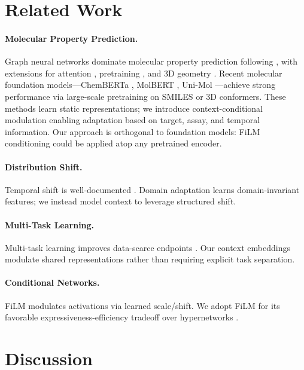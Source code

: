 \documentclass{article}
\begin{document}
\section{Related Work}
\label{sec:related}

\paragraph{Molecular Property Prediction.}
Graph neural networks dominate molecular property prediction following \citet{gilmer_2017_mpnn}, with extensions for attention \citep{xiong_2020_attentivefp}, pretraining \citep{rong_2020_grover, hu_2020_gnn_pretrain}, and 3D geometry \citep{schutt_2017_schnet, gasteiger_2020_dimenet}. Recent molecular foundation models---ChemBERTa \citep{chithrananda_2020_chemberta}, MolBERT \citep{fabian_2020_molbert}, Uni-Mol \citep{zhou_2023_unimol}---achieve strong performance via large-scale pretraining on SMILES or 3D conformers. These methods learn static representations; we introduce context-conditional modulation enabling adaptation based on target, assay, and temporal information. Our approach is orthogonal to foundation models: FiLM conditioning could be applied atop any pretrained encoder.

\paragraph{Distribution Shift.}
Temporal shift is well-documented \citep{sheridan_2013_time_split, martin_2019_temporal}. Domain adaptation \citep{ben_david_2010_theory} learns domain-invariant features; we instead model context to leverage structured shift.

\paragraph{Multi-Task Learning.}
Multi-task learning improves data-scarce endpoints \citep{ramsundar_2015_massively}. Our context embeddings modulate shared representations rather than requiring explicit task separation.

\paragraph{Conditional Networks.}
FiLM \citep{perez_2018_film} modulates activations via learned scale/shift. We adopt FiLM for its favorable expressiveness-efficiency tradeoff over hypernetworks \citep{ha_2017_hypernetworks}.

\section{Discussion}
\label{sec:discussion}
\end{document}

